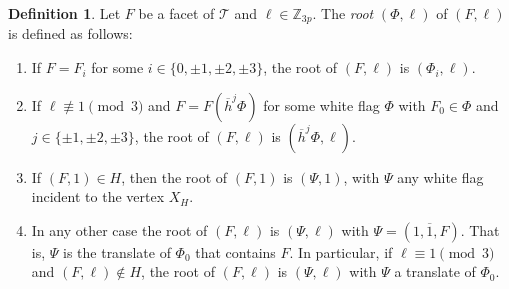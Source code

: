 \documentclass[final]{amsart}
\theoremstyle{plain}
\theoremstyle{definition}
\newtheorem{defn}[thm]{Definition}
\theoremstyle{remark}
\numberwithin{equation}{section}
\renewcommand{\{}{\lbrace}
\renewcommand{\}}{\rbrace}
\renewcommand{\bar}{\overline}
\newcommand{\bZ}{\mathbb{Z}}
\newcommand{\cT}{\mathcal{T}}
\newcommand{\vect}[1]{\bar{\mathrm{#1}}}
\newcommand{\kng}{{h}}
\newcommand{\etab}{\bar{\kng}}
\begin{document}
\begin{defn}\label{defn:baseFlags}
Let $F$ be a facet of $\cT$ and $\ell \in \bZ_{3p}$. 
The \emph{root} $(\Phi,\ell)$ of $(F,\ell)$ is defined as follows:
\begin{enumerate}
    \item \label{item:WhiteBase} If $F = F_i$ for some $i \in \{0,\pm1,\pm2,\pm3\}$, the root of $(F,\ell)$ is $(\Phi_{i}, \ell)$. 
    \item \label{item:BlackBase} If $\ell \not\equiv 1 \pmod{3}$ and $F=F(\etab^{j}\Phi)$ for some white flag $\Phi$ with $F_{0}\in \Phi$ and $j \in \{\pm1,\pm2,\pm3\}$, the root of $\left( F,\ell \right)$  is $(\etab^{j}\Phi,\ell)$.
    \item \label{item:rootsH} If $(F,1) \in H$, then the root of $(F,1)$ is $(\Psi,1)$, with $\Psi$ any white flag incident to the vertex $X_H$.
    \item \label{item:OthersBase} In any other case the root of $(F,\ell)$ is $(\Psi, \ell)$ with $\Psi = (1, \vect{1}, F)$. That is, $\Psi$ is the translate of $\Phi_{0}$ that contains $F$.
    In particular, if  $\ell \equiv 1 \pmod{3}$ and $(F,\ell) \not\in H$, the root of $(F,\ell)$ is $(\Psi, \ell)$ with $\Psi$ a translate of $\Phi_{0}$.
    \end{enumerate}
\end{defn}
\end{document}
